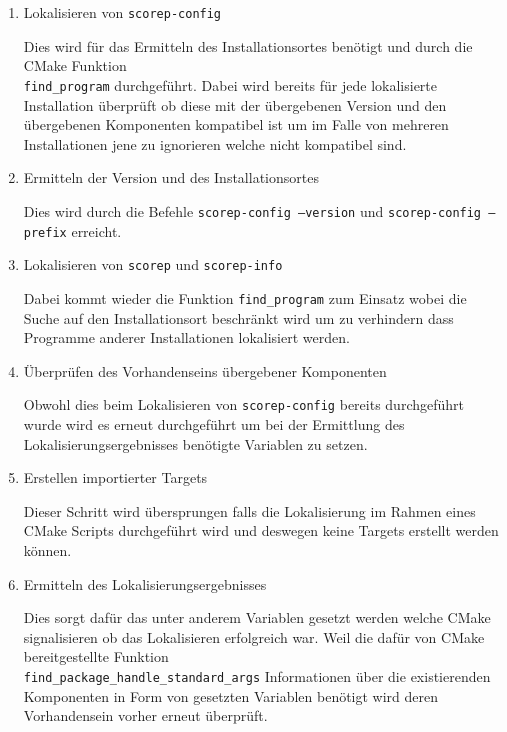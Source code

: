 \documentclass[german,proseminar,hyperref,utf8,lof]{zihpub}
\begin{document}
    \begin{enumerate}
        \item Lokalisieren von \texttt{scorep-config}

        Dies wird für das Ermitteln des Installationsortes benötigt und durch die CMake Funktion \\
        \texttt{find\_program} durchgeführt.
        Dabei wird bereits für jede lokalisierte Installation überprüft ob diese mit der übergebenen
        Version und den übergebenen Komponenten kompatibel ist um im Falle von mehreren Installationen
        jene zu ignorieren welche nicht kompatibel sind.

        \item Ermitteln der Version und des Installationsortes

        Dies wird durch die Befehle \texttt{scorep-config --version} und \texttt{scorep-config --prefix} erreicht.

        \item Lokalisieren von \texttt{scorep} und \texttt{scorep-info}

        Dabei kommt wieder die Funktion \texttt{find\_program} zum Einsatz wobei die Suche auf den Installationsort
        beschränkt wird um zu verhindern dass Programme anderer Installationen lokalisiert werden.

        \item Überprüfen des Vorhandenseins übergebener Komponenten

        Obwohl dies beim Lokalisieren von \texttt{scorep-config} bereits durchgeführt wurde wird es erneut
        durchgeführt um bei der Ermittlung des Lokalisierungsergebnisses benötigte Variablen zu setzen.

        \item Erstellen importierter Targets

        Dieser Schritt wird übersprungen falls die Lokalisierung im Rahmen eines CMake Scripts
        durchgeführt wird und deswegen keine Targets erstellt werden können.

        \item Ermitteln des Lokalisierungsergebnisses

        Dies sorgt dafür das unter anderem Variablen gesetzt werden welche CMake signalisieren ob das
        Lokalisieren erfolgreich war.
        Weil die dafür von CMake bereitgestellte Funktion \\ \texttt{find\_package\_handle\_standard\_args}
        Informationen über die existierenden Komponenten in Form von gesetzten Variablen benötigt wird deren
        Vorhandensein vorher erneut überprüft.
    \end{enumerate}
    
\end{document}

